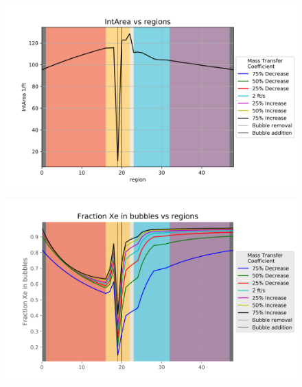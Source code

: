 \begin{figure}[p] 
\centering
\begin{minipage}{.5\textwidth}
  \centering
  \includegraphics[width=1.0\linewidth]{images/CoeffIntArea.png}
  \label{fig:CoeffIntAreaCon}
\end{minipage}%
\begin{minipage}{.5\textwidth}
  \centering
  \includegraphics[width=1.0\linewidth]{images/CoeffFractionXeInBubbles.png}
  \label{fig:CoeffPercentXe}
\end{minipage}
\end{figure}

